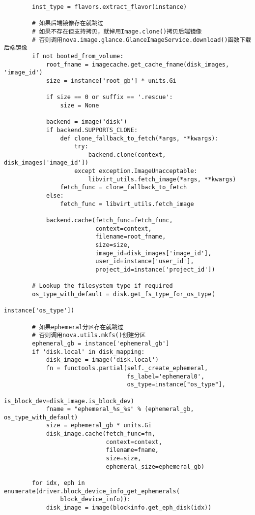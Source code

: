 \documentclass[a4paper,left=1.5cm,right=1.5cm,11pt]{article}
\begin{document}
\begin{lstlisting}
        inst_type = flavors.extract_flavor(instance)
        
		# 如果后端镜像存在就跳过
		# 如果不存在但支持拷贝，就掉用Image.clone()拷贝后端镜像
		# 否则调用nova.image.glance.GlanceImageService.download()函数下载后端镜像
        if not booted_from_volume:
            root_fname = imagecache.get_cache_fname(disk_images, 'image_id')
            size = instance['root_gb'] * units.Gi

            if size == 0 or suffix == '.rescue':
                size = None

            backend = image('disk')
            if backend.SUPPORTS_CLONE:
                def clone_fallback_to_fetch(*args, **kwargs):
                    try:
                        backend.clone(context, disk_images['image_id'])
                    except exception.ImageUnacceptable:
                        libvirt_utils.fetch_image(*args, **kwargs)
                fetch_func = clone_fallback_to_fetch
            else:
                fetch_func = libvirt_utils.fetch_image

            backend.cache(fetch_func=fetch_func,
                          context=context,
                          filename=root_fname,
                          size=size,
                          image_id=disk_images['image_id'],
                          user_id=instance['user_id'],
                          project_id=instance['project_id'])

        # Lookup the filesystem type if required
        os_type_with_default = disk.get_fs_type_for_os_type(
                                                          instance['os_type'])
		
		# 如果ephemeral分区存在就跳过
		# 否则调用nova.utils.mkfs()创建分区
        ephemeral_gb = instance['ephemeral_gb']
        if 'disk.local' in disk_mapping:
            disk_image = image('disk.local')
            fn = functools.partial(self._create_ephemeral,
                                   fs_label='ephemeral0',
                                   os_type=instance["os_type"],
                                   is_block_dev=disk_image.is_block_dev)
            fname = "ephemeral_%s_%s" % (ephemeral_gb, os_type_with_default)
            size = ephemeral_gb * units.Gi
            disk_image.cache(fetch_func=fn,
                             context=context,
                             filename=fname,
                             size=size,
                             ephemeral_size=ephemeral_gb)

        for idx, eph in enumerate(driver.block_device_info_get_ephemerals(
                block_device_info)):
            disk_image = image(blockinfo.get_eph_disk(idx))


\end{lstlisting}
\end{document}
